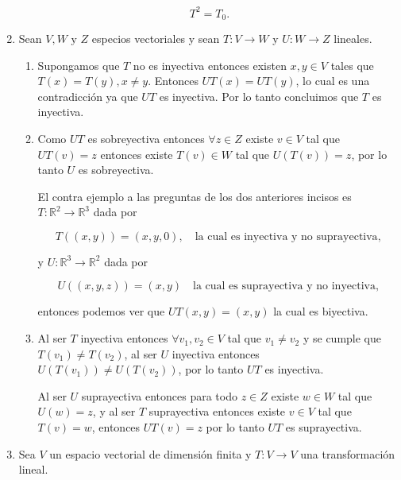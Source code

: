 \documentclass[letterpaper]{article}
\theoremstyle{definition}
\theoremstyle{lemathm}
\theoremstyle{lemademthm}
\newcommand{\txty}{\text{ y }}
\newcommand{\R}{\mathbb{R}}
\begin{document}
\begin{enumerate}
        \[T^2 = T_0.\]

        \newpage

        \item Sean $V,W \txty Z$ especios vectoriales y sean $T : V \rightarrow W$ y $U : W \rightarrow Z$ lineales.
        
        \begin{enumerate}
            \item Supongamos que $T$ no es inyectiva entonces existen $x,y \in V$ tales que $T(x) = T(y), x \neq y$. Entonces $UT(x) = UT(y)$, lo cual es una contradicción ya que $UT$ es inyectiva. Por lo tanto concluimos que $T$ es inyectiva.
            
            \item Como $UT$ es sobreyectiva entonces $\forall z \in Z$ existe $v \in V$ tal que $UT(v) = z$ entonces existe $T(v) \in W$ tal que $U(T(v)) = z$, por lo tanto $U$ es sobreyectiva.
            
            \bigskip
            
            El contra ejemplo a las preguntas de los dos anteriores incisos es $T : \R^2 \rightarrow \R^3$ dada por 
            
            \[T((x,y)) = (x,y,0), \quad \text{la cual es inyectiva y no suprayectiva},\]
            
            y $U: \R^3 \rightarrow \R^2$ dada por 
            
            \[U((x,y,z)) = (x,y) \quad \text{la cual es suprayectiva y no inyectiva},\]
            
            entonces podemos ver que $UT(x,y) = (x,y)$ la cual es biyectiva.

            \bigskip

            \item 
            
            Al ser $T$ inyectiva entonces $\forall v_1,v_2 \in V$ tal que $v_1 \neq v_2$ y se cumple que $T(v_1) \neq T(v_2)$, al ser $U$ inyectiva entonces $U(T(v_1)) \neq U(T(v_2))$, por lo tanto $UT$ es inyectiva.
            
            Al ser $U$ suprayectiva entonces para todo $z \in Z$ existe $w \in W$ tal que $U(w) = z$, y al ser $T$ suprayectiva entonces existe $v \in V$ tal que $T(v) = w$, entonces $UT(v) = z$ por lo tanto $UT$ es suprayectiva.
        \end{enumerate}

        \item Sea $V$ un espacio vectorial de dimensión finita y $T: V \rightarrow V$ una transformación lineal.
        

\end{enumerate}
\end{document}
